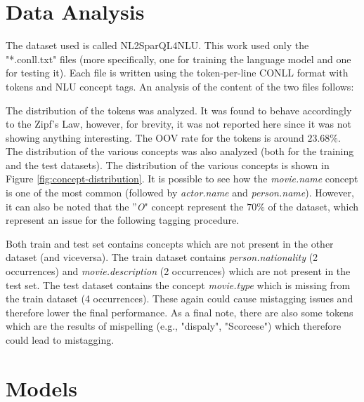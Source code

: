 \documentclass[11pt,a4paper]{article}
\begin{document}
\section{Data Analysis}

The dataset used is called NL2SparQL4NLU. This work used only the "*.conll.txt" files (more specifically, one for training the language model and one for testing it). Each file is written using the token-per-line CONLL format with tokens and NLU concept tags. An analysis of the content of the two files follows:

The distribution of the tokens was analyzed. It was found to behave accordingly to the
Zipf's Law, however, for brevity, it was not reported here since it was not showing 
anything interesting. The OOV rate for the tokens is around $23.68\%$. 
The distribution of the various concepts was also analyzed (both for the training
and the test datasets). The distribution of the various concepts is shown in Figure \ref{fig:concept-distribution}. It is possible to see how the \textit{movie.name} concept is one of the most common (followed by \textit{actor.name} and \textit{person.name}). However, it can also be noted that the ''\textit{O}" concept represent the $70\%$ of the dataset, which represent an issue for the following tagging procedure.

Both train and test set contains concepts which are not present in the other dataset (and viceversa). The train dataset contains \textit{person.nationality} (2 occurrences) and \textit{movie.description} (2 occurrences) which are not present in the test set. The test dataset contains the concept \textit{movie.type} which is missing from the train dataset (4 occurrences). These again could cause mistagging issues and therefore lower the final performance.
As a final note, there are also
some tokens which are the results of mispelling (e.g., "dispaly", "Scorcese") which therefore could lead to mistagging.


\section{Models}
\end{document}

